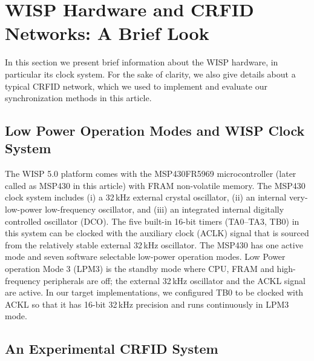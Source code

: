 \documentclass[journal,draftcls,onecolumn,12pt,twoside]{IEEEtranTCOM}
\begin{document}
\section{WISP Hardware and CRFID Networks: A Brief Look}
\label{sec:Clock_Hardware}

In this section we present brief information about the WISP hardware, in particular its clock system. For the sake of clarity, we 
also give details about a typical CRFID network, which we used to implement and evaluate our synchronization methods in this article.

\subsection{Low Power Operation Modes and WISP Clock System}
\label{subsec:clock_system}

The WISP 5.0 platform comes with the MSP430FR5969 \cite{msp430fr5969_data_sheet} microcontroller (later called as MSP430 in this article) with FRAM non-volatile memory. The MSP430 clock system includes (i) a 32\,kHz external crystal oscillator, (ii) an internal very-low-power low-frequency oscillator, and (iii) an integrated internal digitally controlled oscillator (DCO). The five built-in 16-bit timers (TA0--TA3, TB0) in this system can be clocked with the auxiliary clock (ACLK) signal that is sourced from the relatively stable external 32\,kHz oscillator. The MSP430 has one active mode and seven software selectable low-power operation modes. Low Power operation Mode 3 (LPM3) is the standby mode where CPU, FRAM and high-frequency peripherals are off; the external 32\,kHz oscillator and the ACKL signal are active. In our target implementations, we configured TB0 to be clocked  with ACKL so that it has 16-bit 32\,kHz precision and runs continuously in LPM3 mode.

\subsection{\label{sec:testbed}An Experimental CRFID System}
\end{document}
